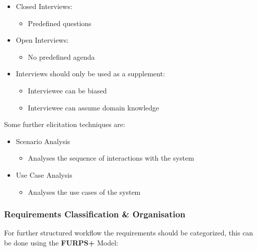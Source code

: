 \documentclass[
../../Software_Engineering_Summary.tex,
]
{subfiles}
\begin{document}
\begin{defbox}
    \begin{itemize}
        \item Closed Interviews:
        \begin{itemize}
            \item Predefined questions
        \end{itemize}
        \item Open Interviews:
        \begin{itemize}
            \item No predefined agenda 
        \end{itemize}
        \item Interviews should only be used as a supplement:
        \begin{itemize}
            \item Interviewee can be biased
            \item Interviewee can assume domain knowledge
        \end{itemize}
    \end{itemize}
\end{defbox}

Some further elicitation techniques are:

\begin{defbox}
    \begin{itemize}
        \item Scenario Analysis
        \begin{itemize}
            \item Analyses the sequence of interactions with the system
        \end{itemize}
        \item Use Case Analysis
        \begin{itemize}
            \item Analyses the use cases of the system
        \end{itemize}
    \end{itemize}
\end{defbox}

\subsubsection{Requirements Classification \& Organisation}
For further structured workflow the requirements should be categorized, this can be done using the \textbf{FURPS+} Model:
\end{document}
